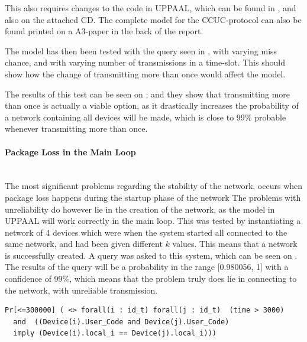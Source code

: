 This also requires changes to the code in UPPAAL, which can be found in , and also on the attached CD.
The complete model for the CCUC-protocol can also be found printed on a A3-paper in the back of the report.

The model has then been tested with the query seen in , with varying miss chance, and with varying number of transmissions in a time-slot.
This should show how the change of transmitting more than once would affect the model.

The results of this test can be seen on ; and they show that transmitting more than once is actually a viable option, as it drastically increases the probability of a network containing all devices will be made, which is close to 99\% probable whenever transmitting more than once.

\paragraph{Package Loss in the Main Loop}\hfill \\
The most significant problems regarding the stability of the network, occurs when package loss happens during the startup phase of the network
The problems with unreliability do however lie in the creation of the network, as the model in UPPAAL will work correctly in the main loop.
This was tested by instantiating a network of 4 devices which were when the system started all connected to the same network, and had been given different $k$ values. 
This means that a network is successfully created.
A query was asked to this system, which can be seen on .
The results of the query will be a probability in the range [0.980056, 1] with a confidence of 99\%, which means that the problem truly does lie in connecting to the network, with unreliable transmission. 

\begin{lstlisting}[style=UPPAAL, caption={Query for UPPAAL asking if for all devices i and j, when they are in the location \texttt{User\_Code} will they have they then have the same value for \texttt{local\_i}.}, label={stable-network-query}, float=hb]
Pr[<=300000] ( <> forall(i : id_t) forall(j : id_t)  (time > 3000) 
  and  ((Device(i).User_Code and Device(j).User_Code) 
  imply (Device(i).local_i == Device(j).local_i)))
\end{lstlisting}
 
